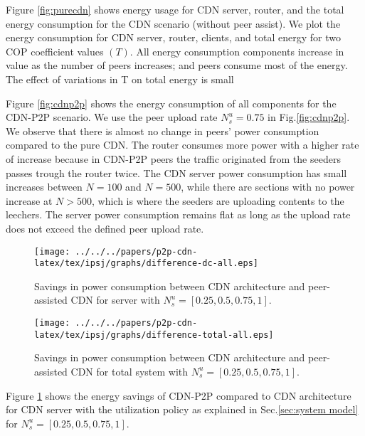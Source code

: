 Figure \ref{fig:purecdn} shows energy usage for CDN server, router, and the total energy consumption for the CDN scenario (without peer assist). 
We plot the energy consumption for CDN server, router, clients, and total energy for two COP coefficient values $(T)$.  
All energy consumption components increase in value as the number of peers increases; and peers consume most of the energy. 
The effect of variations in T on total energy is small

Figure \ref{fig:cdnp2p} shows the energy consumption of all components for the CDN-P2P scenario. 
We use the peer upload rate $N_s^u=0.75$ in Fig.\ref{fig:cdnp2p}. 
We observe that there is almost no change in peers’ power consumption compared to the pure CDN. 
The router consumes more power with a higher rate of increase because in CDN-P2P peers the traffic originated from the seeders passes trough the router twice.  
The CDN server power consumption has small increases between $N=100$ and $N=500$, while there are sections with no power increase at $N > 500$, which is where the seeders are uploading contents to the leechers. 
The server power consumption remains flat as long as the upload rate does not exceed the defined peer upload rate.



\begin{figure}[h]
\begin{center}
\texttt{[image: ../../../papers/p2p-cdn-latex/tex/ipsj/graphs/difference-dc-all.eps]}
\end{center}
\caption{Savings in power consumption between CDN architecture and peer-assisted CDN for server with $N_s^u=[0.25,0.5,0.75,1]$.}
\label{fig:diffdc}
\vspace{-2mm}
\end{figure} 

\begin{figure}[h]
\begin{center}
\texttt{[image: ../../../papers/p2p-cdn-latex/tex/ipsj/graphs/difference-total-all.eps]}
\end{center}
\caption{Savings in power consumption between CDN architecture and peer-assisted CDN for total system with $N_s^u=[0.25,0.5,0.75,1]$.}
\label{fig:difftotal}
\vspace{-2mm}
\end{figure} 

Figure \ref{fig:diffdc} shows the energy savings of CDN-P2P compared to CDN architecture for CDN server with the utilization policy as explained in Sec.\ref{sec:system model} for $N_s^u=[0.25,0.5,0.75,1]$. 

